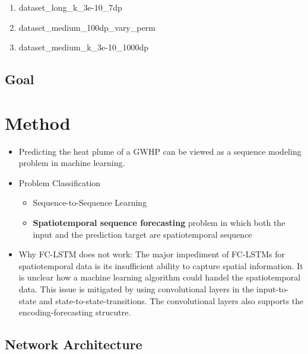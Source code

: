 \documentclass[
  a4paper,  %
  twoside,  %
  bibliography=totoc,
  headsepline,
  cleardoublepage=empty,
  parskip=half,
  draft=false
]{scrbook}
\begin{document}
\begin{enumerate}
    \item dataset\_long\_k\_3e-10\_7dp
    \item dataset\_medium\_100dp\_vary\_perm
    \item dataset\_medium\_k\_3e-10\_1000dp
\end{enumerate}
\section{Goal}

\chapter{Method}
\begin{itemize}
    \item Predicting the heat plume of a GWHP can be viewed as a sequence modeling problem in machine learning.
    \item Problem Classification
    \begin{itemize}
        \item Sequence-to-Sequence Learning \cite{sutskever2014sequence}
        \item \textbf{Spatiotemporal sequence forecasting} problem in which both the input and the prediction target are spatiotemporal sequence \cite{ShiConvLSTMPrecipitation}
    \end{itemize}
    \item Why FC-LSTM does not work: \newline
    The major impediment of FC-LSTMs for spatiotemporal data is its insufficient ability to capture spatial information. 
    It is unclear how a machine learning algorithm could handel the spatiotemporal data.
    This issue is mitigated by using convolutional layers in the input-to-state and state-to-state-transitions. 
    The convolutional layers also supports the encoding-forecasting strucutre. 
\end{itemize}

\section{Network Architecture}
\end{document}
